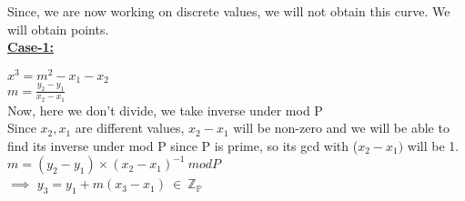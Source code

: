 \documentclass[11pt]{article}
\begin{document}
Since, we are now working on discrete values, we will not obtain this curve. We will obtain points.\\
\textbf{\underline{Case-1:}}\\
\begin{center}
    $x^3=m^2-x_1-x_2$\\
    $m = \frac{y_2-y_1}{x_2-x_1}$\\
    Now, here we don't divide, we take inverse under mod P\\
    Since $x_2, x_1$ are different values, $x_2-x_1$ will be non-zero and we will be able to find its inverse under mod P since P is prime, so its gcd with ($x_2-x_1)$ will be 1.
    $m = (y_2-y_1)\times{(x_2-x_1)}^{-1}\ mod P$\\
    $\implies$ $y_3=y_1+m(x_3-x_1)\ \in\ \mathbb{Z_P}$\\
\end{center}
\end{document}
